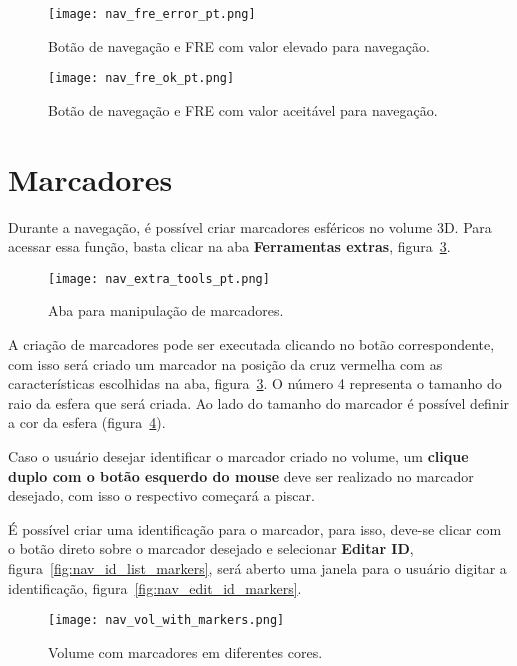 \begin{figure}[!htb]
\centering
\texttt{[image: nav\_fre\_error\_pt.png]}
\caption{Botão de navegação e FRE com valor elevado para navegação.}
\label{fig:nav_fre_error}
\end{figure}

\begin{figure}[!htb]
\centering
\texttt{[image: nav\_fre\_ok\_pt.png]}
\caption{Botão de navegação e FRE com valor aceitável para navegação.}
\label{fig:nav_fre_ok}
\end{figure}

\section{Marcadores}

Durante a navegação, é possível criar marcadores esféricos no volume 3D. Para acessar essa função, basta clicar na aba \textbf{Ferramentas extras}, figura~\ref{fig:nav_extra_tools}.

\begin{figure}[!htb]
\centering
\texttt{[image: nav\_extra\_tools\_pt.png]}
\caption{Aba para manipulação de marcadores.}
\label{fig:nav_extra_tools}
\end{figure}

A criação de marcadores pode ser executada clicando no botão correspondente, com isso será criado um marcador na posição da cruz vermelha com as características escolhidas na aba, figura~\ref{fig:nav_extra_tools}. O número 4 representa o tamanho do raio da esfera que será criada. Ao lado do tamanho do marcador é possível definir a cor da esfera (figura~\ref{fig:nav_vol_with_markers}). 

Caso o usuário desejar identificar o marcador criado no volume, um \textbf{clique duplo com o botão esquerdo do mouse} deve ser realizado no marcador desejado, com isso o respectivo começará a piscar.

É possível criar uma identificação para o marcador, para isso, deve-se clicar com o botão direto sobre o marcador desejado e selecionar \textbf{Editar ID}, figura~\ref{fig:nav_id_list_markers}, será aberto uma janela para o usuário digitar a identificação, figura~\ref{fig:nav_edit_id_markers}.

\begin{figure}[!htb]
\centering
\texttt{[image: nav\_vol\_with\_markers.png]}
\caption{Volume com marcadores em diferentes cores.}
\label{fig:nav_vol_with_markers}
\end{figure} 

